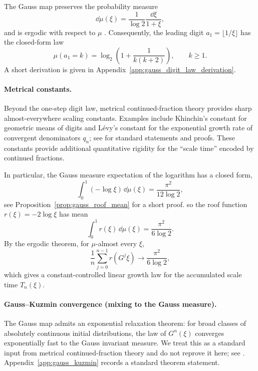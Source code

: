 The Gauss map preserves the probability measure
\begin{equation}
\dd\mu(\xi)=\frac{1}{\log 2}\frac{\dd\xi}{1+\xi},
\end{equation}
and is ergodic with respect to $\mu$ \cite{IosifescuKraaikamp2002}. Consequently, the leading digit $a_1=\lfloor 1/\xi\rfloor$ has the closed-form law
\begin{equation}
\label{eq:gauss_digit_law}
\mu(a_1=k)=\log_2\!\left(1+\frac{1}{k(k+2)}\right),\qquad k\ge 1.
\end{equation}
A short derivation is given in Appendix~\ref{app:gauss_digit_law_derivation}.

\paragraph{Metrical constants.}
Beyond the one-step digit law, metrical continued-fraction theory provides sharp almost-everywhere scaling constants. Examples include Khinchin's constant for geometric means of digits and L\'evy's constant for the exponential growth rate of convergent denominators $q_n$; see \cite{IosifescuKraaikamp2002} for standard statements and proofs. These constants provide additional quantitative rigidity for the ``scale time'' encoded by continued fractions.
\par
In particular, the Gauss measure expectation of the logarithm has a closed form,
\begin{equation}
\int_0^1 (-\log \xi)\,\dd\mu(\xi)=\frac{\pi^2}{12\log 2},
\end{equation}
see Proposition~\ref{prop:gauss_roof_mean} for a short proof.
so the roof function $r(\xi)=-2\log\xi$ has mean
\begin{equation}
\int_0^1 r(\xi)\,\dd\mu(\xi)=\frac{\pi^2}{6\log 2}.
\end{equation}
By the ergodic theorem, for $\mu$-almost every $\xi$,
\begin{equation}
\frac{1}{n}\sum_{j=0}^{n-1} r(G^j\xi)\to \frac{\pi^2}{6\log 2},
\end{equation}
which gives a constant-controlled linear growth law for the accumulated scale time $T_n(\xi)$.

\paragraph{Gauss--Kuzmin convergence (mixing to the Gauss measure).}
The Gauss map admits an exponential relaxation theorem: for broad classes of absolutely continuous initial distributions, the law of $G^n(\xi)$ converges exponentially fast to the Gauss invariant measure. We treat this as a standard input from metrical continued-fraction theory and do not reprove it here; see \cite{IosifescuKraaikamp2002}.
Appendix~\ref{app:gauss_kuzmin} records a standard theorem statement.

